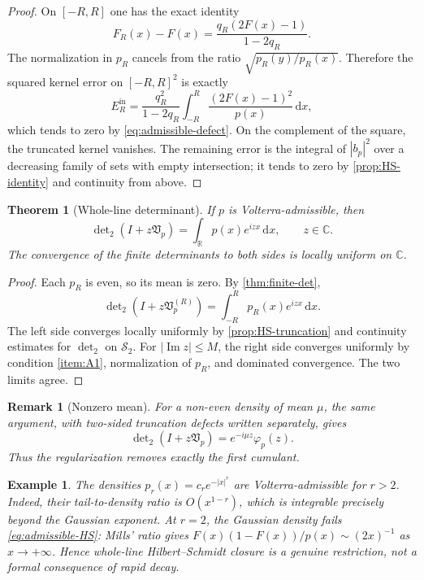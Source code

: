 \documentclass[11pt,reqno]{amsart}
\numberwithin{equation}{section}
\newtheorem{theorem}{Theorem}[section]
\newtheorem{remark}[remark]{Remark}
\newtheorem{example}[example]{Example}
\newcommand{\C}{\mathbb C}
\newcommand{\R}{\mathbb R}
\newcommand{\1}{\mathbf 1}
\newcommand{\HS}{\mathcal S_2}
\newcommand{\Vp}{\mathfrak V_p}
\newcommand{\dd}{\,\mathrm d}
\newcommand{\detTwo}{\det\nolimits_{2}}
\begin{document}
\begin{proof}
On $[-R,R]$ one has the exact identity
\begin{equation}\label{eq:FR-F}
 F_R(x)-F(x)=\frac{q_R(2F(x)-1)}{1-2q_R}.
\end{equation}
The normalization in $p_R$ cancels from the ratio
$\sqrt{p_R(y)/p_R(x)}$.  Therefore the squared kernel error on
$[-R,R]^2$ is exactly
\begin{equation}\label{eq:interior-error}
 E_R^{\mathrm{in}}
 =\frac{q_R^2}{1-2q_R}
 \int_{-R}^R\frac{(2F(x)-1)^2}{p(x)}\dd x,
\end{equation}
which tends to zero by \eqref{eq:admissible-defect}.  On the complement of
the square, the truncated kernel vanishes.  The remaining error is the
integral of $|b_p|^2$ over a decreasing family of sets with empty intersection;
it tends to zero by \cref{prop:HS-identity} and continuity from above.
\end{proof}

\begin{theorem}[Whole-line determinant]\label{thm:whole-line-det}
If $p$ is Volterra-admissible, then
\begin{equation}\label{eq:whole-line-det}
 \boxed{
 \detTwo(I+z\Vp)=\int_{\R}p(x)e^{izx}\dd x,
 \qquad z\in\C.}
\end{equation}
The convergence of the finite determinants to both sides is locally uniform
on $\C$.
\end{theorem}

\begin{proof}
Each $p_R$ is even, so its mean is zero.  By \cref{thm:finite-det},
\[
 \detTwo(I+z\Vp^{(R)})
 =\int_{-R}^Rp_R(x)e^{izx}\dd x.
\]
The left side converges locally uniformly by
\cref{prop:HS-truncation} and continuity estimates for $\detTwo$ on $\HS$.
For $|\operatorname{Im}z|\leq M$, the right side converges uniformly by
condition \ref{item:A1}, normalization of $p_R$, and dominated convergence.
The two limits agree.
\end{proof}

\begin{remark}[Nonzero mean]\label{rem:nonzero-mean}
For a non-even density of mean $\mu$, the same argument, with two-sided
truncation defects written separately, gives
\[
 \detTwo(I+z\Vp)=e^{-i\mu z}\varphi_p(z).
\]
Thus the regularization removes exactly the first cumulant.
\end{remark}

\begin{example}\label{ex:supergaussian}
The densities $p_r(x)=c_r e^{-|x|^r}$ are Volterra-admissible for $r>2$.
Indeed, their tail-to-density ratio is $O(x^{1-r})$, which is integrable
precisely beyond the Gaussian exponent.  At $r=2$, the Gaussian density fails
\eqref{eq:admissible-HS}: Mills' ratio gives
$F(x)(1-F(x))/p(x)\sim(2x)^{-1}$ as $x\to+\infty$.  Hence whole-line
Hilbert--Schmidt closure is a genuine restriction, not a formal consequence
of rapid decay.
\end{example}
\end{document}
